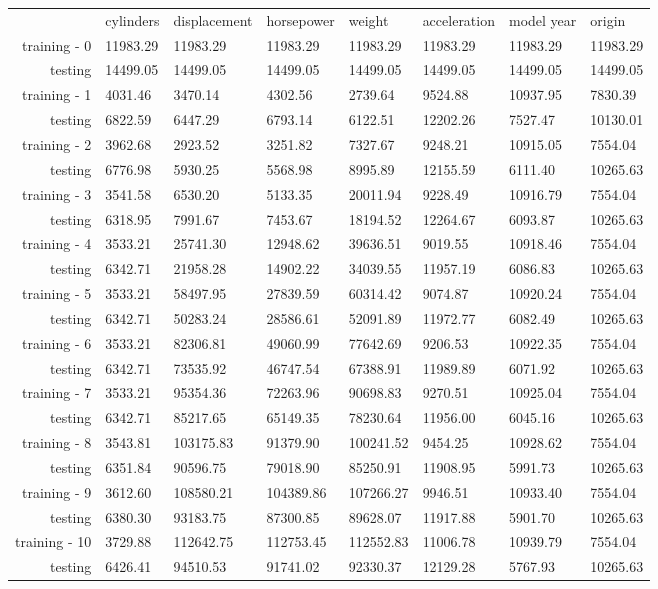 \documentclass{article}
\begin{document}
\begin{center}
\begin{tabular}{rlllllll}
 & cylinders & displacement & horsepower & weight & acceleration & model year & origin \\ 
training - 0 & 11983.29 & 11983.29 & 11983.29 & 11983.29 & 11983.29 & 11983.29 & 11983.29 \\
testing & 14499.05 & 14499.05 & 14499.05 & 14499.05 & 14499.05 & 14499.05 & 14499.05 \\
training - 1 & 4031.46 & 3470.14 & 4302.56 & 2739.64 & 9524.88 & 10937.95 & 7830.39 \\
testing & 6822.59 & 6447.29 & 6793.14 & 6122.51 & 12202.26 & 7527.47 & 10130.01 \\
training - 2 & 3962.68 & 2923.52 & 3251.82 & 7327.67 & 9248.21 & 10915.05 & 7554.04 \\
testing & 6776.98 & 5930.25 & 5568.98 & 8995.89 & 12155.59 & 6111.40 & 10265.63 \\
training - 3 & 3541.58 & 6530.20 & 5133.35 & 20011.94 & 9228.49 & 10916.79 & 7554.04 \\
testing & 6318.95 & 7991.67 & 7453.67 & 18194.52 & 12264.67 & 6093.87 & 10265.63 \\
training - 4 & 3533.21 & 25741.30 & 12948.62 & 39636.51 & 9019.55 & 10918.46 & 7554.04 \\
testing & 6342.71 & 21958.28 & 14902.22 & 34039.55 & 11957.19 & 6086.83 & 10265.63 \\
training - 5 & 3533.21 & 58497.95 & 27839.59 & 60314.42 & 9074.87 & 10920.24 & 7554.04 \\
testing & 6342.71 & 50283.24 & 28586.61 & 52091.89 & 11972.77 & 6082.49 & 10265.63 \\
training - 6 & 3533.21 & 82306.81 & 49060.99 & 77642.69 & 9206.53 & 10922.35 & 7554.04 \\
testing & 6342.71 & 73535.92 & 46747.54 & 67388.91 & 11989.89 & 6071.92 & 10265.63 \\
training - 7 & 3533.21 & 95354.36 & 72263.96 & 90698.83 & 9270.51 & 10925.04 & 7554.04 \\
testing & 6342.71 & 85217.65 & 65149.35 & 78230.64 & 11956.00 & 6045.16 & 10265.63 \\
training - 8 & 3543.81 & 103175.83 & 91379.90 & 100241.52 & 9454.25 & 10928.62 & 7554.04 \\
testing & 6351.84 & 90596.75 & 79018.90 & 85250.91 & 11908.95 & 5991.73 & 10265.63 \\
training - 9 & 3612.60 & 108580.21 & 104389.86 & 107266.27 & 9946.51 & 10933.40 & 7554.04 \\
testing & 6380.30 & 93183.75 & 87300.85 & 89628.07 & 11917.88 & 5901.70 & 10265.63 \\
training - 10 & 3729.88 & 112642.75 & 112753.45 & 112552.83 & 11006.78 & 10939.79 & 7554.04 \\
testing & 6426.41 & 94510.53 & 91741.02 & 92330.37 & 12129.28 & 5767.93 & 10265.63 \\
\end{tabular}
\end{center}
\end{document}
